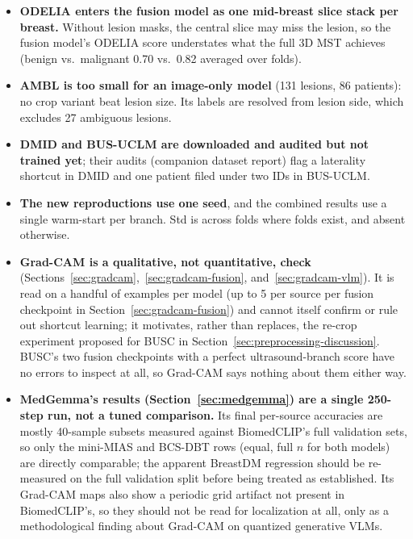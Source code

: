 \documentclass[11pt]{article}
\begin{document}
\begin{itemize}
  \item \textbf{ODELIA enters the fusion model as one mid-breast slice
    stack per breast.} Without lesion masks, the central slice may miss the
    lesion, so the fusion model's ODELIA score understates what the full 3D
    MST achieves (benign vs.\ malignant 0.70 vs.\ 0.82 averaged over folds).
  \item \textbf{AMBL is too small for an image-only model} (131 lesions, 86
    patients): no crop variant beat lesion size. Its labels are resolved
    from lesion side, which excludes 27 ambiguous lesions.
  \item \textbf{DMID and BUS-UCLM are downloaded and audited but not trained
    yet}; their audits (companion dataset report) flag a laterality shortcut
    in DMID and one patient filed under two IDs in BUS-UCLM.
  \item \textbf{The new reproductions use one seed}, and the combined
    results use a single warm-start per branch. Std is across folds where
    folds exist, and absent otherwise.
  \item \textbf{Grad-CAM is a qualitative, not quantitative, check}
    (Sections~\ref{sec:gradcam},~\ref{sec:gradcam-fusion},
    and~\ref{sec:gradcam-vlm}). It is read on a handful of examples per
    model (up to 5 per source per fusion checkpoint in
    Section~\ref{sec:gradcam-fusion}) and cannot itself confirm or rule
    out shortcut learning; it motivates, rather than replaces, the
    re-crop experiment proposed for BUSC in
    Section~\ref{sec:preprocessing-discussion}. BUSC's two fusion
    checkpoints with a perfect ultrasound-branch score have no errors to
    inspect at all, so Grad-CAM says nothing about them either way.
  \item \textbf{MedGemma's results (Section~\ref{sec:medgemma}) are a
    single 250-step run, not a tuned comparison.} Its final per-source
    accuracies are mostly 40-sample subsets measured against BiomedCLIP's
    full validation sets, so only the mini-MIAS and BCS-DBT rows (equal,
    full $n$ for both models) are directly comparable; the apparent
    BreastDM regression should be re-measured on the full validation
    split before being treated as established. Its Grad-CAM maps also
    show a periodic grid artifact not present in BiomedCLIP's, so they
    should not be read for localization at all, only as a methodological
    finding about Grad-CAM on quantized generative VLMs.
\end{itemize}



\end{document}
